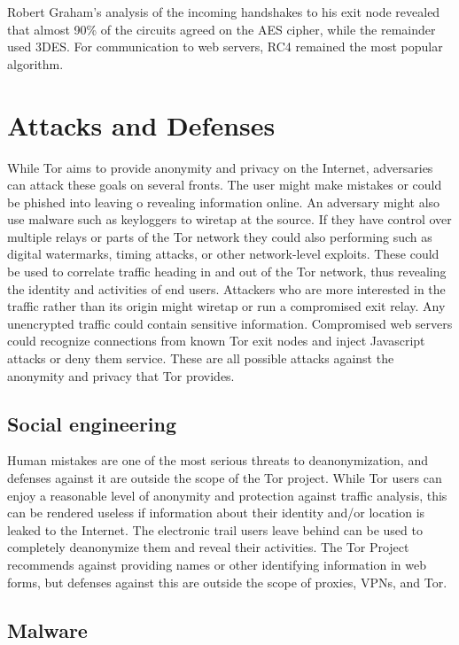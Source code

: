 \documentclass[journal]{IEEEtran}
\begin{document}
Robert Graham's analysis of the incoming handshakes to his exit node revealed that almost 90\% of the circuits agreed on the AES cipher, while the remainder used 3DES. For communication to web servers, RC4 remained the most popular algorithm.\cite{Graham2013}

\section{Attacks and Defenses}

While Tor aims to provide anonymity and privacy on the Internet, adversaries can attack these goals on several fronts. The user might make mistakes or could be phished into leaving o revealing information online. An adversary might also use malware such as keyloggers to wiretap at the source. If they have control over multiple relays or parts of the Tor network they could also performing such as digital watermarks, timing attacks, or other network-level exploits. These could be used to correlate traffic heading in and out of the Tor network, thus revealing the identity and activities of end users. Attackers who are more interested in the traffic rather than its origin might wiretap or run a compromised exit relay. Any unencrypted traffic could contain sensitive information. Compromised web servers could recognize connections from known Tor exit nodes and inject Javascript attacks or deny them service. These are all possible attacks against the anonymity and privacy that Tor provides.

\subsection{Social engineering}

Human mistakes are one of the most serious threats to deanonymization, and defenses against it are outside the scope of the Tor project. While Tor users can enjoy a reasonable level of anonymity and protection against traffic analysis, this can be rendered useless if information about their identity and/or location is leaked to the Internet. The electronic trail users leave behind can be used to completely deanonymize them and reveal their activities. The Tor Project recommends against providing names or other identifying information in web forms, but defenses against this are outside the scope of proxies, VPNs, and Tor.

\subsection{Malware}
\end{document}
